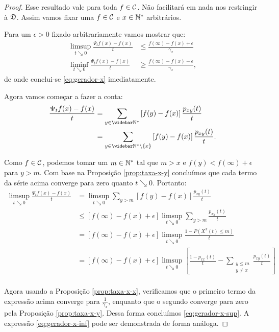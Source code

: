 \begin{proof}
  Esse resultado vale para toda $f \in {\mathcal{C}}$. Não facilitará em nada
  nos restringir à ${\mathfrak{D}}$. Assim vamos fixar uma $f \in {\mathcal{C}}$ e $x \in {\mathbb{N^*}}$
  arbitrários.

  Para um $\epsilon > 0$ fixado arbitrariamente vamos mostrar que:
  \begin{align}
    \label{eq:gerador-x-sup}
    \limsup_{t \searrow 0} \frac{\Psi_t f (x) - f(x)}{t} &\leq
    \frac{f(\infty) - f(x) + \epsilon}{\gamma_x}\\
    \label{eq:gerador-x-inf}
    \liminf_{t \searrow 0} \frac{\Psi_t f (x) - f(x)}{t} &\geq
    \frac{f(\infty) - f(x) - \epsilon}{\gamma_x}, 
  \end{align}
  de onde conclui-se \eqref{eq:gerador-x} imediatamente.

  Agora vamos começar a fazer a conta:
  \begin{align*}
    \frac{\Psi_t f(x) - f(x)}{t}
    &= \sum_{y \in \Nzb} \left[ f(y) - f(x) \right] \frac{p_{x y}(t)}{t}\\
    &=
    \sum_{y \in \Nzb\setminus\{x\}} \left[ f(y) - f(x) \right] \frac{p_{x y}(t)}{t}.
  \end{align*}


  Como $f \in {\mathcal{C}}$, podemos tomar um $m \in {\mathbb{N^*}}$ tal que $m > x$ e
  $f(y) < f(\infty) + \epsilon$ para $y > m$. Com base na Proposição
  \ref{prop:taxa-x-y} concluímos que cada termo da série acima
  converge para zero quanto $t \searrow 0$. Portanto:
  \begin{align*}
    \limsup_{t \searrow 0}
    \frac{\Psi_t f(x) - f(x)}{t}
    &= \limsup_{t \searrow 0}
    \sum_{y > m} \left[ f(y) - f(x) \right] \frac{p_{x y}(t)}{t}\\
    &\leq \left[ f(\infty) - f(x) + \epsilon \right] \limsup_{t \searrow 0} 
    \sum_{y > m} \frac{p_{x y}(t)}{t}\\
    &= \left[ f(\infty) - f(x) + \epsilon \right] \limsup_{t \searrow 0}
    \frac{1 - P\left( X^x(t) \leq m \right)}{t}\\
    &= \left[ f(\infty) - f(x) + \epsilon \right] \limsup_{t \searrow 0}
    \left[
      \frac{1 - p_{x x}(t)}{t}
      - \sum_{\substack{y \leq m \\ y\neq x}} \frac{p_{x y}(t)}{t}
    \right]\\
  \end{align*}

  Agora usando a Proposição \ref{prop:taxa-x-x}, verificamos que o
  primeiro termo da expressão acima converge para
  $\frac{1}{\gamma_x}$, enquanto que o segundo converge para zero pela
  Proposição \ref{prop:taxa-x-y}. Dessa forma concluímos
  \eqref{eq:gerador-x-sup}. A expressão \eqref{eq:gerador-x-inf} pode
  ser demonstrada de forma análoga.
\end{proof}


